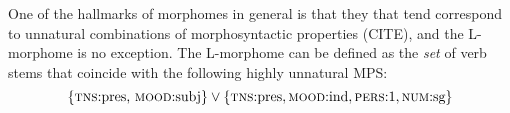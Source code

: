 %
One of the hallmarks of morphomes in general is that they that tend correspond to unnatural combinations 
of morphosyntactic properties (CITE), and the L-morphome is no exception. 
The L-morphome can be defined as the \emph{set} of verb 
stems that coincide with the following highly unnatural \ac{MPS}:
\begin{equation}
\{ \text{\textsc{tns}:pres, \textsc{mood}:subj}\} \vee \{\text{\textsc{tns}:pres},\text{\textsc{mood}:ind},\text{\textsc{pers}:1},\text{\textsc{num}:sg}\}
\end{equation}




